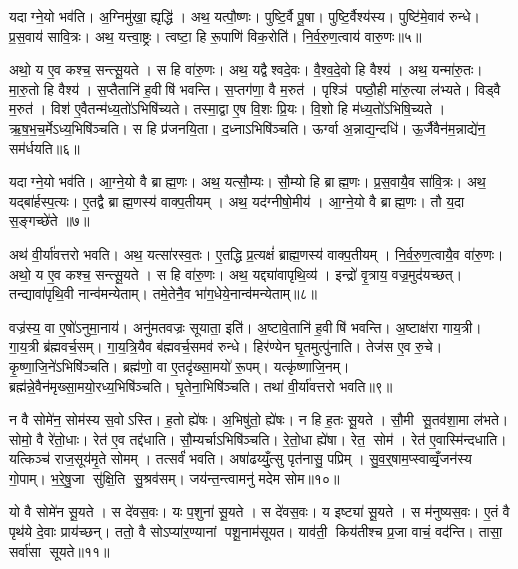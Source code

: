 यदाग्ने॒यो भव॑ति। अ॒ग्निमु॑खा॒ ह्यृद्धि॑। अथ॒ यत्पौ॒ष्णः। पुष्टि॒र्वै पू॒षा। पुष्टि॒र्वैश्य॑स्य। पुष्टि॑मे॒वाव॑ रुन्धे। प्र॒स॒वाय॑ सावि॒त्रः। अथ॒ यत्त्वा॒ष्ट्रः। त्वष्टा॒ हि रू॒पाणि॑ विक॒रोति॑। नि॒र्व॒रु॒ण॒त्वाय॑ वारु॒णः॥५॥

अथो॒ य ए॒व कश्च॒ सन्त्सू॒यते। स हि वा॑रु॒णः। अथ॒ यद्वैश्वदे॒वः। वै॒श्व॒दे॒वो हि वैश्य॑। अथ॒ यन्मा॑रु॒तः। मा॒रु॒तो हि वैश्य॑। स॒प्तैतानि॑ ह॒वीषि॑ भवन्ति। स॒प्तग॑णा॒ वै म॒रुत॑। पृश्ञि॑ पष्ठौ॒ही मा॑रु॒त्या ल॑भ्यते। विड्वै म॒रुत॑। विश॑ ए॒वैतन्म॑ध्य॒तो॑ऽभिषि॑च्यते। तस्मा॒द्वा ए॒ष वि॒शः प्रि॒यः। वि॒शो हि म॑ध्य॒तो॑ऽभिषि॒च्यते। ऋ॒ष॒भ॒च॒र्मेऽध्य॒भिषि॑ञ्चति। स हि प्र॑जनयि॒ता। द॒ध्नाऽभिषि॑ञ्चति। ऊर्ग्वा अ॒न्नाद्य॒न्दधि॑। ऊ॒र्जैवैन॑म॒न्नाद्ये॑न॒ सम॑र्धयति॥६॥\anuvakamend[वा॒रु॒णो विड्वै म॒रुतो॒ऽष्टौ च॑]

यदाग्ने॒यो भव॑ति। आ॒ग्ने॒यो वै ब्राह्म॒णः। अथ॒ यत्सौ॒म्यः। सौ॒म्यो हि ब्राह्म॒णः। प्र॒स॒वायै॒व सा॑वि॒त्रः। अथ॒ यद्बा॑र्\mbox{}हस्प॒त्यः। ए॒तद्वै ब्राह्म॒णस्य॑ वाक्प॒तीयम्। अथ॒ यद॑ग्नीषो॒मीय॑। आ॒ग्ने॒यो वै ब्राह्म॒णः। तौ य॒दा स॒ङ्गच्छे॑ते ॥७॥

अथ॑ वी॒र्या॑वत्तरो भवति। अथ॒ यत्सा॑रस्व॒तः। ए॒तद्धि प्र॒त्यक्षं॑ ब्राह्म॒णस्य॑ वाक्प॒तीयम्। नि॒र्व॒रु॒ण॒त्वायै॒व वा॑रु॒णः। अथो॒ य ए॒व कश्च॒ सन्त्सू॒यते। स हि वा॑रु॒णः। अथ॒ यद्द्या॑वापृथि॒व्य॑। इन्द्रो॑ वृ॒त्राय॒ वज्र॒मुद॑यच्छत्। तन्द्यावा॑पृथि॒वी नान्व॑मन्येताम्। तमे॒तेनै॒व भा॑ग॒धेये॒नान्व॑मन्येताम्॥८॥

वज्र॑स्य॒ वा ए॒षो॑ऽनुमा॒नाय॑। अनु॑मतवज्रः सूयाता॒ इति॑। अ॒ष्टावे॒तानि॑ ह॒वीषि॑ भवन्ति। अ॒ष्टाक्ष॑रा गाय॒त्री। गा॒य॒त्री ब्र॑ह्मवर्च॒सम्। गा॒य॒त्रि॒यैव ब॑ह्मवर्च॒समव॑ रुन्धे। हिर॑ण्येन घृ॒तमुत्पु॑नाति। तेज॑स ए॒व रु॒चे। कृ॒ष्णा॒जि॒ने॑ऽभिषि॑ञ्चति। ब्रह्म॑णो॒ वा ए॒तदृ॑ख्सा॒मयो॑ रू॒पम्। यत्कृ॑ष्णाजि॒नम्। ब्रह्म॑न्ने॒वैन॑मृख्सा॒मयो॒रध्य॒भिषि॑ञ्चति। घृ॒तेना॒भिषि॑ञ्चति। तथा॑ वी॒र्या॑वत्तरो भवति॥९॥\anuvakamend[स॒ङ्गच्छे॑ते भाग॒धेये॒नान्व॑मन्येता रू॒पञ्च॒त्वारि॑ च]

न वै सोमे॑न॒ सोम॑स्य स॒वोऽस्ति। ह॒तो ह्ये॑षः। अ॒भिषु॑तो॒ ह्ये॑षः। न हि ह॒तः सू॒यते। सौ॒मी सू॒तव॑शा॒मा ल॑भते। सोमो॒ वै रे॑तो॒धाः। रेत॑ ए॒व तद्द॑धाति। सौ॒म्यर्चाऽभिषि॑ञ्चति। रे॒तो॒धा ह्ये॑षा। रेत॒ सोम॑। रेत॑ ए॒वास्मि॑न्दधाति। यत्किञ्च॑ राज॒सूय॑मृ॒ते सोमम्। तत्सर्वं॑ भवति। अषा॑ढय्युँ॒त्सु पृत॑नासु॒ पप्रिम्। सु॒व॒र्॒षाम॒प्स्वाव्वृँ॒जन॑स्य गो॒पाम्। भ॒रे॒षु॒जा सु॑क्षि॒ति सु॒श्रव॑सम्। जय॑न्त॒न्त्वामनु॑ मदेम सोम॥१०॥\anuvakamend[रेत॒ सोम॑ स॒प्त च॑]

यो वै सोमे॑न सू॒यते। स दे॑वस॒वः। यः प॒शुना॑ सू॒यते। स दे॑वस॒वः। य इष्ट्या॑ सू॒यते। स म॑नुष्यस॒वः। ए॒तं वै पृथ॑ये दे॒वाः प्राय॑च्छन्। ततो॒ वै सोऽप्या॑र॒ण्यानां पशू॒नाम॑सूयत। याव॑ती॒ किय॑तीश्च प्र॒जा वाचं॒ वद॑न्ति। तासा॒ सर्वा॑सा सूयते॥११॥


